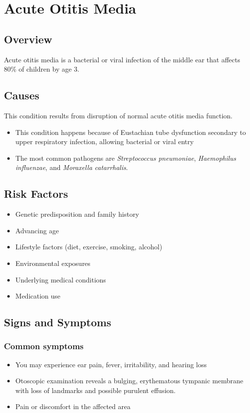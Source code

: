 \chapter{Acute Otitis Media}
\label{sec:Acute Otitis Media}

\section{Overview}
Acute otitis media is a bacterial or viral infection of the middle ear that affects 80\% of children by age 3.
\section{Causes}
This condition results from disruption of normal acute otitis media function.

\begin{itemize}[noitemsep]
  \item This condition happens because of Eustachian tube dysfunction secondary to upper respiratory infection, allowing bacterial or viral entry
  \item The most common pathogens are \textit{Streptococcus pneumoniae}, \textit{Haemophilus influenzae}, and \textit{Moraxella catarrhalis}.
\end{itemize}
\section{Risk Factors}


\begin{itemize}[noitemsep]
  \item Genetic predisposition and family history
  \item Advancing age
  \item Lifestyle factors (diet, exercise, smoking, alcohol)
  \item Environmental exposures
  \item Underlying medical conditions
  \item Medication use
\end{itemize}
\section{Signs and Symptoms}

\subsection{Common symptoms}
\begin{itemize}[noitemsep]
  \item You may experience ear pain, fever, irritability, and hearing loss
  \item Otoscopic examination reveals a bulging, erythematous tympanic membrane with loss of landmarks and possible purulent effusion.
  \item Pain or discomfort in the affected area
  \end{itemize}

